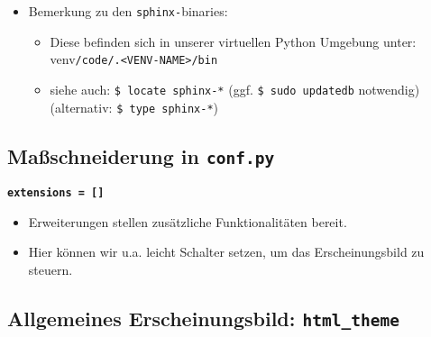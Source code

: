 \begin{itemize}
	\item
	      Bemerkung zu den \texttt{sphinx-}binaries:

	      \begin{itemize}

		      \item
		            Diese befinden sich in unserer virtuellen Python Umgebung unter:
		            venv\texttt{/code/.\textless{}VENV-NAME\textgreater{}/bin}
		      \item
		            siehe auch: \texttt{\$\ locate\ sphinx-*} (ggf.
		            \texttt{\$ sudo\ updatedb} notwendig) (alternativ:
		            \texttt{\$ type\ sphinx-*})
	      \end{itemize}
\end{itemize}

\subsection{Maßschneiderung in \texttt{conf.py}}

\textbf{\texttt{extensions\ =\ {[}{]}}}

\begin{itemize}

	\item
	      Erweiterungen stellen zusätzliche Funktionalitäten bereit.
	\item
	      Hier können wir u.a. leicht Schalter setzen, um das Erscheinungsbild zu
	      steuern.
\end{itemize}

\hypertarget{allgemeines-erscheinungsbild-html_theme}{%
	\subsection{\texorpdfstring{\textbf{Allgemeines Erscheinungsbild:
				\texttt{html\_theme}}}{Allgemeines Erscheinungsbild: html\_theme}}\label{allgemeines-erscheinungsbild-html_theme}}

